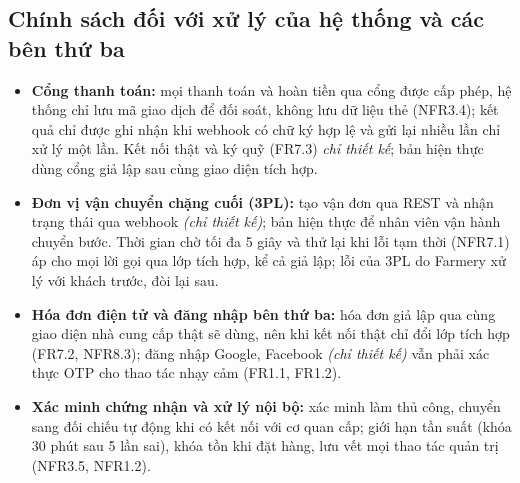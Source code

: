 \subsection{Chính sách đối với xử lý của hệ thống và các bên thứ ba}
\label{subsec:chinhsachbenthuba}

\begin{itemize}
    \item \textbf{Cổng thanh toán:} mọi thanh toán và hoàn tiền qua cổng được cấp phép, hệ thống chỉ lưu mã giao dịch để đối soát, không lưu dữ liệu thẻ (NFR3.4); kết quả chỉ được ghi nhận khi webhook có chữ ký hợp lệ và gửi lại nhiều lần chỉ xử lý một lần. Kết nối thật và ký quỹ (FR7.3) \emph{chỉ thiết kế}; bản hiện thực dùng cổng giả lập sau cùng giao diện tích hợp.
    \item \textbf{Đơn vị vận chuyển chặng cuối (3PL):} tạo vận đơn qua REST và nhận trạng thái qua webhook \emph{(chỉ thiết kế)}; bản hiện thực để nhân viên vận hành chuyển bước. Thời gian chờ tối đa 5 giây và thử lại khi lỗi tạm thời (NFR7.1) áp cho mọi lời gọi qua lớp tích hợp, kể cả giả lập; lỗi của 3PL do Farmery xử lý với khách trước, đòi lại sau.
    \item \textbf{Hóa đơn điện tử và đăng nhập bên thứ ba:} hóa đơn giả lập qua cùng giao diện nhà cung cấp thật sẽ dùng, nên khi kết nối thật chỉ đổi lớp tích hợp (FR7.2, NFR8.3); đăng nhập Google, Facebook \emph{(chỉ thiết kế)} vẫn phải xác thực OTP cho thao tác nhạy cảm (FR1.1, FR1.2).
    \item \textbf{Xác minh chứng nhận và xử lý nội bộ:} xác minh làm thủ công, chuyển sang đối chiếu tự động khi có kết nối với cơ quan cấp; giới hạn tần suất (khóa 30 phút sau 5 lần sai), khóa tồn khi đặt hàng, lưu vết mọi thao tác quản trị (NFR3.5, NFR1.2).
\end{itemize}
